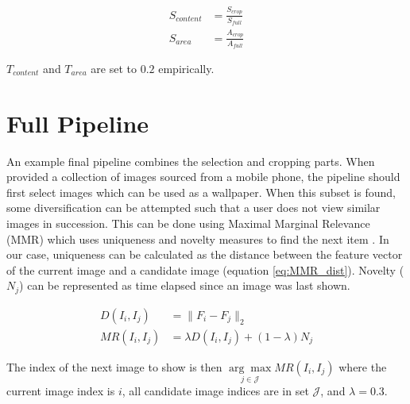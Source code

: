 \begin{align}
	S_{content} &= \frac{S_{crop}}{S_{full}}	\label{eq:S_content}\\
	S_{area}    &= \frac{A_{crop}}{A_{full}}	\label{eq:S_area}
\end{align}

$T_{content}$ and $T_{area}$ are set to $0.2$ empirically.


\section{Full Pipeline}

An example final pipeline combines the selection and cropping parts.
When provided a collection of images sourced from a mobile phone, the pipeline
should first select images which can be used as a wallpaper.
When this subset is found, some diversification can be attempted such that a
user does not view similar images in succession.
This can be done using Maximal Marginal Relevance (MMR) which uses uniqueness
and novelty measures to find the next item \cite{carbonell1998use}.
In our case, uniqueness can be calculated as the distance between the feature
vector of the current image and a candidate image (equation \ref{eq:MMR_dist}).
Novelty ($N_j$) can be represented as time elapsed since an image was last shown.

\begin{align}
	D(I_i, I_j)  &= \|F_i - F_j\|_2                       \label{eq:MMR_dist} \\
	MR(I_i, I_j) &= \lambda D(I_i, I_j) + (1-\lambda) N_j
\end{align}

The index of the next image to show is then $\underset{j\in\mathcal{J}}{\arg\max}MR(I_i, I_j)$
where the current image index is $i$, all candidate image indices are in set
$\mathcal{J}$, and $\lambda=0.3$.

